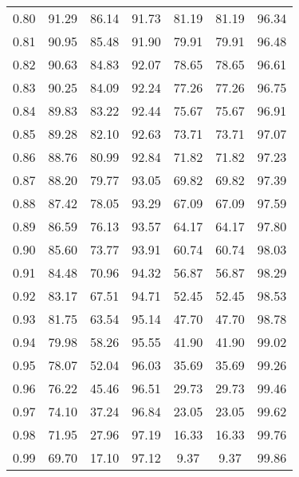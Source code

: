 \begin{tabular}{|c|c|c|c|c|c|c|}
      0.80 &     91.29 &     86.14 &      91.73 &   81.19 &      81.19 &         96.34 \\
      0.81 &     90.95 &     85.48 &      91.90 &   79.91 &      79.91 &         96.48 \\
      0.82 &     90.63 &     84.83 &      92.07 &   78.65 &      78.65 &         96.61 \\
      0.83 &     90.25 &     84.09 &      92.24 &   77.26 &      77.26 &         96.75 \\
      0.84 &     89.83 &     83.22 &      92.44 &   75.67 &      75.67 &         96.91 \\
      0.85 &     89.28 &     82.10 &      92.63 &   73.71 &      73.71 &         97.07 \\
      0.86 &     88.76 &     80.99 &      92.84 &   71.82 &      71.82 &         97.23 \\
      0.87 &     88.20 &     79.77 &      93.05 &   69.82 &      69.82 &         97.39 \\
      0.88 &     87.42 &     78.05 &      93.29 &   67.09 &      67.09 &         97.59 \\
      0.89 &     86.59 &     76.13 &      93.57 &   64.17 &      64.17 &         97.80 \\
      0.90 &     85.60 &     73.77 &      93.91 &   60.74 &      60.74 &         98.03 \\
      0.91 &     84.48 &     70.96 &      94.32 &   56.87 &      56.87 &         98.29 \\
      0.92 &     83.17 &     67.51 &      94.71 &   52.45 &      52.45 &         98.53 \\
      0.93 &     81.75 &     63.54 &      95.14 &   47.70 &      47.70 &         98.78 \\
      0.94 &     79.98 &     58.26 &      95.55 &   41.90 &      41.90 &         99.02 \\
      0.95 &     78.07 &     52.04 &      96.03 &   35.69 &      35.69 &         99.26 \\
      0.96 &     76.22 &     45.46 &      96.51 &   29.73 &      29.73 &         99.46 \\
      0.97 &     74.10 &     37.24 &      96.84 &   23.05 &      23.05 &         99.62 \\
      0.98 &     71.95 &     27.96 &      97.19 &   16.33 &      16.33 &         99.76 \\
      0.99 &     69.70 &     17.10 &      97.12 &    9.37 &       9.37 &         99.86 \\
\bottomrule
\end{tabular}
